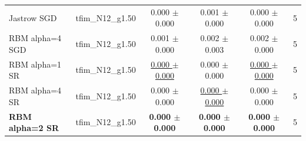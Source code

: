 \begin{tabular}{llcccc}
Jastrow SGD & tfim\_N12\_g1.50 & 0.000 $\pm$ 0.000 & 0.001 $\pm$ 0.000 & 0.000 $\pm$ 0.000 & 5 \\
RBM alpha=4 SGD & tfim\_N12\_g1.50 & 0.001 $\pm$ 0.000 & 0.002 $\pm$ 0.003 & 0.002 $\pm$ 0.000 & 5 \\
RBM alpha=1 SR & tfim\_N12\_g1.50 & \underline{0.000 $\pm$ 0.000} & 0.000 $\pm$ 0.000 & \underline{0.000 $\pm$ 0.000} & 5 \\
RBM alpha=4 SR & tfim\_N12\_g1.50 & 0.000 $\pm$ 0.000 & \underline{0.000 $\pm$ 0.000} & 0.000 $\pm$ 0.000 & 5 \\
\textbf{RBM alpha=2 SR} & tfim\_N12\_g1.50 & \textbf{0.000 $\pm$ 0.000} & \textbf{0.000 $\pm$ 0.000} & \textbf{0.000 $\pm$ 0.000} & 5 \\
\bottomrule
\end{tabular}
